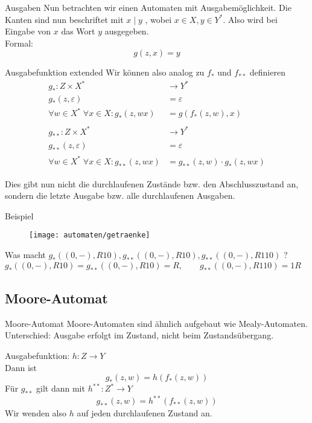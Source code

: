 \begin{frame}{Ausgaben}
	Nun betrachten wir einen Automaten mit Ausgabemöglichkeit. Die Kanten sind nun beschriftet mit $x \mid y$ , wobei $x\in X, y\in Y^* $. Also wird bei Eingabe von $x$ das Wort $y$ ausgegeben. \\ 
	Formal: $$g(z,x) = y$$
\end{frame}

\begin{frame}
	\begin{block}{Ausgabefunktion extended}
		Wir können also analog zu $f_*$ und $f_{**}$ definieren
		\begin{align*}
		g_* : Z\times X^* &\to Y^* \\
		g_*(z,\varepsilon) &= \varepsilon \\
		\forall w\in X^* \; \forall x\in X : g_*(z,wx) &= g(f_*(z,w),x) \\ \\
		g_{**} : Z\times X^* &\to Y^* \\ 
		g_{**}(z,\varepsilon) &= \varepsilon \\
		\forall w\in X^* \; \forall x\in X : g_{**}(z,wx) &= g_{**}(z,w)\cdot g_*(z,wx) 			
		\end{align*} \pause
	\end{block}
	
	Dies gibt nun nicht die durchlaufenen Zustände bzw. den Abschlusszustand an, sondern die letzte Ausgabe bzw. alle durchlaufenen Ausgaben. 

\end{frame}

\begin{frame}{Beispiel}
	\begin{figure}[H]
		\texttt{[image: automaten/getraenke]}			
	\end{figure}
	Was macht $g_*((0,-),R10) , g_{**}((0,-),R10) , g_{**}((0,-),R110) $ ? \\ \pause
	$g_*((0,-),R10) = g_{**}((0,-),R10) = R, \qquad g_{**}((0,-),R110) = 1R $	
\end{frame}
	

\subsection{Moore-Automat}
\begin{frame}{Moore-Automat}
	Moore-Automaten sind ähnlich aufgebaut wie Mealy-Automaten.\\
	Unterschied: Ausgabe erfolgt im Zustand, nicht beim Zustandsübergang. \\ \pause 
	
	Ausgabefunktion: $h:Z\to Y$\\
	Dann ist $$ g_* (z,w) = h(f_*(z,w)) $$
	\pause
	Für $g_{**}$ gilt dann mit $h^{**}:Z^*\to Y$  $$ g_{**}(z,w) = h^{**} (f_{**}(z,w)) $$
	Wir wenden also $h$ auf jeden durchlaufenen Zustand an.
\end{frame}

